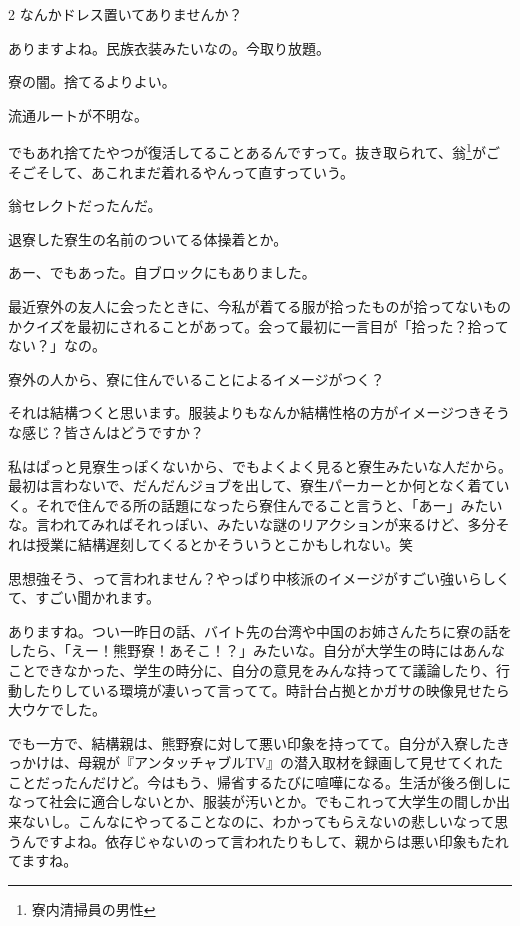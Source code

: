 \begin{multicols}{2}
 なんかドレス置いてありませんか？

 ありますよね。民族衣装みたいなの。今取り放題。

 寮の闇。捨てるよりよい。

 流通ルートが不明な。

 でもあれ捨てたやつが復活してることあるんですって。抜き取られて、翁\footnote{寮内清掃員の男性}がごそごそして、あこれまだ着れるやんって直すっていう。

 翁セレクトだったんだ。

 退寮した寮生の名前のついてる体操着とか。

 あー、でもあった。自ブロックにもありました。

 最近寮外の友人に会ったときに、今私が着てる服が拾ったものが拾ってないものかクイズを最初にされることがあって。会って最初に一言目が「拾った？拾ってない？」なの。


 寮外の人から、寮に住んでいることによるイメージがつく？

 それは結構つくと思います。服装よりもなんか結構性格の方がイメージつきそうな感じ？皆さんはどうですか？

 私はぱっと見寮生っぽくないから、でもよくよく見ると寮生みたいな人だから。最初は言わないで、だんだんジョブを出して、寮生パーカーとか何となく着ていく。それで住んでる所の話題になったら寮住んでること言うと、「あー」みたいな。言われてみればそれっぽい、みたいな謎のリアクションが来るけど、多分それは授業に結構遅刻してくるとかそういうとこかもしれない。笑

 思想強そう、って言われません？やっぱり中核派のイメージがすごい強いらしくて、すごい聞かれます。

 ありますね。つい一昨日の話、バイト先の台湾や中国のお姉さんたちに寮の話をしたら、「えー！熊野寮！あそこ！？」みたいな。自分が大学生の時にはあんなことできなかった、学生の時分に、自分の意見をみんな持ってて議論したり、行動したりしている環境が凄いって言ってて。時計台占拠とかガサの映像見せたら大ウケでした。

 でも一方で、結構親は、熊野寮に対して悪い印象を持ってて。自分が入寮したきっかけは、母親が『アンタッチャブルTV』の潜入取材を録画して見せてくれたことだったんだけど。今はもう、帰省するたびに喧嘩になる。生活が後ろ倒しになって社会に適合しないとか、服装が汚いとか。でもこれって大学生の間しか出来ないし。こんなにやってることなのに、わかってもらえないの悲しいなって思うんですよね。依存じゃないのって言われたりもして、親からは悪い印象もたれてますね。


\end{multicols}
